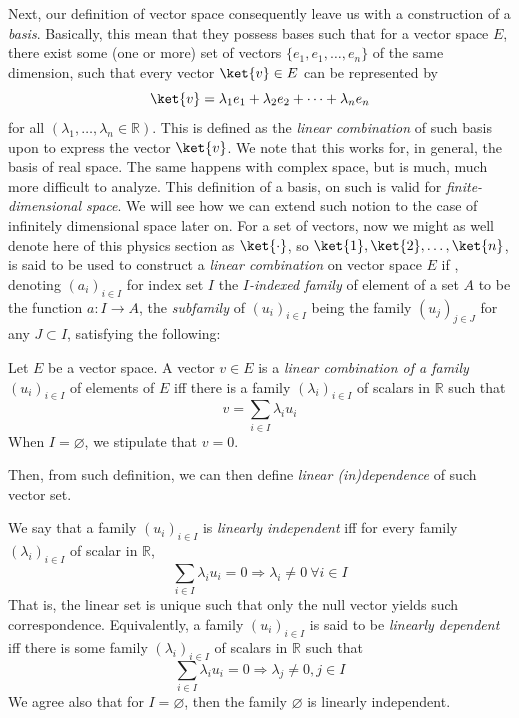 Next, our definition of vector space consequently leave us with a construction of a \textit{basis}. Basically, this mean that they possess bases such that for a vector space $E$, there exist some (one or more) set of vectors $\{e_{1},e_{1},\dots,e_{n}\}$ of the same dimension, such that every vector $\ket{v}\in E$ can be represented by 
\begin{equation}
    \ket{v} = \lambda_{1}e_1 + \lambda_{2}e_{2} + \dots + \lambda_{n} e_{n}
\end{equation}
for all $(\lambda_{1},\dots,\lambda_{n}\in \mathbb{R})$. This is defined as the \textit{linear combination} of such basis upon to express the vector $\ket{v}$. We note that this works for, in general, the basis of real space. The same happens with complex space, but is much, much more difficult to analyze. This definition of a basis, on such is valid for \textit{finite-dimensional space}. We will see how we can extend such notion to the case of infinitely dimensional space later on. For a set of vectors, now we might as well denote here of this physics section as $\ket{\cdot}$, so $\ket{1},\ket{2},\dots,\ket{n}$, is said to be used to construct a \textit{linear combination} on vector space $E$ if , denoting $(a_{i})_{i\in I}$ for index set $I$ the \textit{$I$-indexed family} of element of a set $A$ to be the function $a:I\to A$, the \textit{subfamily} of $(u_{i})_{i\in I}$ being the family $(u_{j})_{j\in J}$ for any $J\subset I$, satisfying the following: 
\begin{definition}
    Let $E$ be a vector space. A vector $v\in E$ is a \textit{linear combination of a family} $(u_{i})_{i\in I}$ of elements of $E$ iff there is a family $(\lambda_{i})_{i\in I}$ of scalars in $\mathbb{R}$ such that 
    \begin{equation}
        v = \sum_{i\in I} \lambda_{i} u_{i}
    \end{equation}
    When $I=\varnothing$, we stipulate that $v=0$. 
\end{definition}
Then, from such definition, we can then define \textit{linear (in)dependence} of such vector set. 
\begin{definition}
    We say that a family $(u_{i})_{i\in I}$ is \textit{linearly independent} iff for every family $(\lambda_{i})_{i\in I}$ of scalar in $\mathbb{R}$, 
    \begin{equation}
        \sum_{i\in I} \lambda_{i}u_{i} = 0 \Rightarrow \lambda_{i} \ne 0 \: \forall i\in I 
    \end{equation}
    That is, the linear set is unique such that only the null vector yields such correspondence. Equivalently, a family $(u_{i})_{i\in I}$ is said to be \textit{linearly dependent} iff there is some family $(\lambda_{i})_{i\in I}$ of scalars in $\mathbb{R}$ such that 
    \begin{equation}
        \sum_{i\in I} \lambda_{i} u_{i} = 0 \Rightarrow \lambda_{j} \neq 0 , j \in I
    \end{equation}
    We agree also that for $I = \varnothing$, then the family $\varnothing$ is linearly independent. 
\end{definition}

